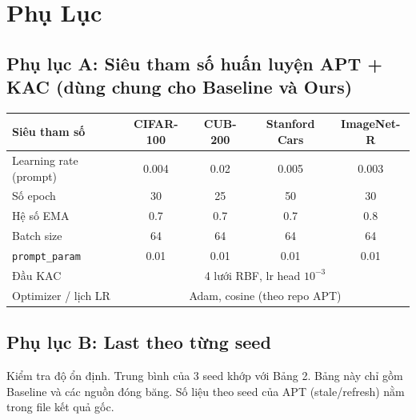 \documentclass[10pt,a4paper]{article}
\begin{document}
\section{Phụ Lục}
\subsection*{Phụ lục A: Siêu tham số huấn luyện APT + KAC (dùng chung cho Baseline và Ours)}
\begin{table}[H]
\centering\small
\begin{tabular}{lcccc}
\toprule
Siêu tham số & CIFAR-100 & CUB-200 & Stanford Cars & ImageNet-R \\
\midrule
Learning rate (prompt) & 0.004 & 0.02 & 0.005 & 0.003 \\
Số epoch & 30 & 25 & 50 & 30 \\
Hệ số EMA & 0.7 & 0.7 & 0.7 & 0.8 \\
Batch size & 64 & 64 & 64 & 64 \\
\texttt{prompt\_param} & 0.01 & 0.01 & 0.01 & 0.01 \\
Đầu KAC & \multicolumn{4}{c}{4 lưới RBF, lr head $10^{-3}$} \\
Optimizer / lịch LR & \multicolumn{4}{c}{Adam, cosine (theo repo APT)} \\
\bottomrule
\end{tabular}
\end{table}

\subsection*{Phụ lục B: Last theo từng seed}
Kiểm tra độ ổn định. Trung bình của 3 seed khớp với Bảng 2. Bảng này chỉ gồm Baseline và các nguồn đóng băng. Số liệu theo seed của APT (stale/refresh) nằm trong file kết quả gốc.
\end{document}
